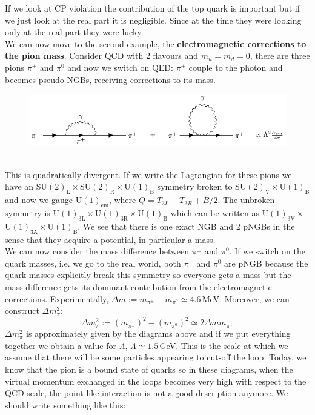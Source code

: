 \documentclass[../main.tex]{subfiles}
\begin{document}
If we look at CP violation the contribution of the top quark is important but if we just look at the real part it is negligible. Since at the time they were looking only at the real part they were lucky.\\
We can now move to the second example, the \textbf{electromagnetic corrections to the pion mass}. Consider QCD with 2 flavours and $m_u=m_d=0$, there are three pions $\pi^\pm$ and $\pi^0$ and now we switch on QED: $\pi^\pm$ couple to the photon and becomes pseudo NGBs, receiving corrections to its mass.
\begin{figure}[h]
    \centering
    \includegraphics{Images/pimass.pdf}
    \caption*{}
\end{figure}\\
This is quadratically divergent. If we write the Lagrangian for these pions we have an SU$(2)_{\text{L}}\times$SU$(2)_{\text{R}}\times$U$(1)_{\text{B}}$ symmetry broken to SU$(2)_{\text{V}}\times$U$(1)_{\text{B}}$ and now we gauge U$(1)_{\text{em}}$, where $Q=T_{3L}+T_{3R}+B/2$. The unbroken symmetry is U$(1)_{\text{3L}}\times$U$(1)_{\text{3R}}\times$U$(1)_{\text{B}}$ which can be written as U$(1)_{\text{3V}}\times$U$(1)_{\text{3A}}\times$U$(1)_{\text{B}}$. We see that there is one exact NGB and 2 pNGBs in the sense that they acquire a potential, in particular a mass.\\
We can now consider the mass difference between $\pi^\pm$ and $\pi^0$. If we switch on the quark masses, i.e. we go to the real world, both $\pi^\pm$ and $\pi^0$ are pNGB because the quark masses explicitly break this symmetry so everyone gets a mass but the mass difference gets its dominant contribution from the electromagnetic corrections. Experimentally, $\Delta m:=m_{\pi^\pm}-m_{\pi^0}\simeq4.6$\,MeV. Moreover, we can construct $\Delta m_\pi^2$:
\[
\Delta m_\pi^2:=(m_{\pi^\pm})^2-(m_{\pi^0})^2\simeq2\Delta mm_{\pi^+}
\]
$\Delta m_\pi^2$ is approximately given by the diagrams above and if we put everything together we obtain a value for $\Lambda$, $\Lambda\simeq1.5$\,GeV. This is the scale at which we assume that there will be some particles appearing to cut-off the loop. Today, we know that the pion is a bound state of quarks so in these diagrams, when the virtual momentum exchanged in the loops becomes very high with respect to the QCD scale, the point-like interaction is not a good description anymore. We should write something like this:
\end{document}
